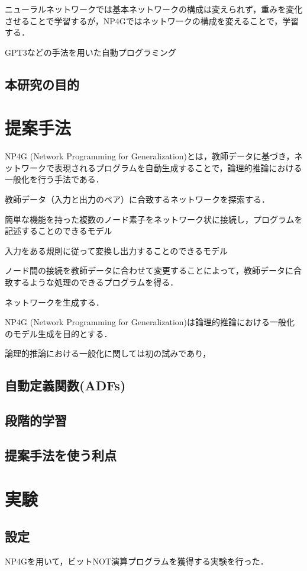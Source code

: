\documentclass[exploratorypaper]{jsaiart} %
\begin{document}
ニューラルネットワークでは基本ネットワークの構成は変えられず，重みを変化させることで学習するが，NP4Gではネットワークの構成を変えることで，学習する．


GPT3などの手法を用いた自動プログラミング


\subsection{本研究の目的}


\section{提案手法}
NP4G (Network Programming for Generalization)とは，教師データに基づき，ネットワークで表現されるプログラムを自動生成することで，論理的推論における一般化を行う手法である．

教師データ（入力と出力のペア）に合致するネットワークを探索する．

簡単な機能を持った複数のノード素子をネットワーク状に接続し，プログラムを記述することのできるモデル

入力をある規則に従って変換し出力することのできるモデル

ノード間の接続を教師データに合わせて変更することによって，教師データに合致するような処理のできるプログラムを得る．

ネットワークを生成する．

NP4G (Network Programming for Generalization)は論理的推論における一般化のモデル生成を目的とする．

論理的推論における一般化に関しては初の試みであり，
\subsection{自動定義関数(ADFs)}

\subsection{段階的学習}
\subsection{提案手法を使う利点}

\section{実験}
\subsection{設定}
NP4Gを用いて，ビットNOT演算プログラムを獲得する実験を行った．
\end{document}
